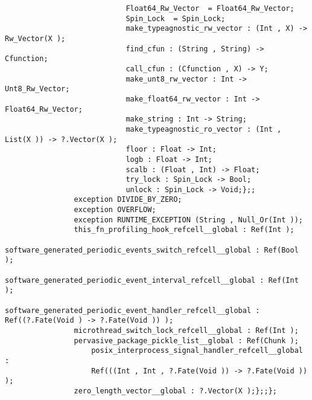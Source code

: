 \begin{verbatim}
                            Float64_Rw_Vector  = Float64_Rw_Vector;
                            Spin_Lock  = Spin_Lock;
                            make_typeagnostic_rw_vector : (Int , X) -> Rw_Vector(X );
                            find_cfun : (String , String) -> Cfunction;
                            call_cfun : (Cfunction , X) -> Y;
                            make_unt8_rw_vector : Int -> Unt8_Rw_Vector;
                            make_float64_rw_vector : Int -> Float64_Rw_Vector;
                            make_string : Int -> String;
                            make_typeagnostic_ro_vector : (Int , List(X )) -> ?.Vector(X );
                            floor : Float -> Int;
                            logb : Float -> Int;
                            scalb : (Float , Int) -> Float;
                            try_lock : Spin_Lock -> Bool;
                            unlock : Spin_Lock -> Void;};;
                exception DIVIDE_BY_ZERO;
                exception OVERFLOW;
                exception RUNTIME_EXCEPTION (String , Null_Or(Int ));
                this_fn_profiling_hook_refcell__global : Ref(Int );
                software_generated_periodic_events_switch_refcell__global : Ref(Bool );
                software_generated_periodic_event_interval_refcell__global : Ref(Int );
                software_generated_periodic_event_handler_refcell__global : Ref((?.Fate(Void ) -> ?.Fate(Void )) );
                microthread_switch_lock_refcell__global : Ref(Int );
                pervasive_package_pickle_list__global : Ref(Chunk );
                    posix_interprocess_signal_handler_refcell__global :
                    Ref(((Int , Int , ?.Fate(Void )) -> ?.Fate(Void )) );
                zero_length_vector__global : ?.Vector(X );};;};
\end{verbatim}
